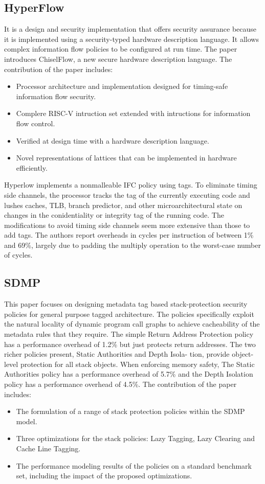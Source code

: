 \subsection{HyperFlow \cite{HyperFlow}} 
It is a design and security implementation that offers security assurance because it is implemented 
using a security-typed hardware description language. It allows complex information flow policies to 
be configured at run time. The paper introduces ChiselFlow, a new secure hardware description language. 
The contribution of the paper includes: 
\begin{itemize}
  \item Processor architecture and implementation designed for timing-safe information flow security. 
  \item Complere RISC-V intruction set extended with intructions for information flow control. 
  \item Verified at design time with a hardware description language. 
  \item Novel representations of lattices that can be implemented in hardware efficiently. 
\end{itemize}
Hyperlow implements a nonmalleable IFC policy using tags.
To eliminate timing side channels, the processor tracks the tag of the currently executing code and lushes caches,
TLB, branch predictor, and other microarchitectural state on changes in the conidentiality or integrity tag of the
running code. The modifications to avoid timing side channels seem more extensive than those to add tags. The
authors report overheads in cycles per instruction of between 1\% and 69\%, largely due to padding the multiply
operation to the worst-case number of cycles.

\subsection{SDMP \cite{Sdmp}}
This paper focuses on designing metadata tag based stack-protection security policies for general purpose tagged
architecture. The policies specifically
exploit the natural locality of dynamic program call graphs to
achieve cacheability of the metadata rules that they require.
The simple Return Address Protection policy has a performance
overhead of 1.2\% but just protects return addresses.
The two richer policies present, Static Authorities and Depth Isola-
tion, provide object-level protection for all stack objects. When
enforcing memory safety, The Static Authorities policy has a
performance overhead of 5.7\% and the Depth Isolation policy
has a performance overhead of 4.5\%.
The contribution of the paper includes:
\begin{itemize}
  \item The formulation of a range of stack protection policies
within the SDMP model.
  \item Three optimizations for the stack policies: Lazy Tagging,
Lazy Clearing and Cache Line Tagging.
  \item The performance modeling results of the policies on
a standard benchmark set, including the impact of the
proposed optimizations.
\end{itemize}  

